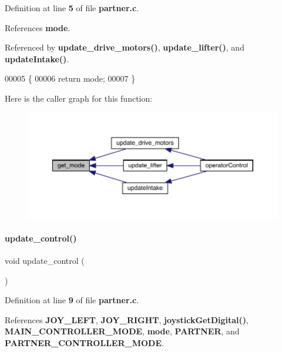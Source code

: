 Definition at line \textbf{ 5} of file \textbf{ partner.\+c}.



References \textbf{ mode}.



Referenced by \textbf{ update\+\_\+drive\+\_\+motors()}, \textbf{ update\+\_\+lifter()}, and \textbf{ update\+Intake()}.


\begin{DoxyCode}
00005                               \{
00006   \textcolor{keywordflow}{return} mode;
00007 \}
\end{DoxyCode}
Here is the caller graph for this function\+:\nopagebreak
\begin{figure}[H]
\begin{center}
\leavevmode
\includegraphics[width=350pt]{partner_8h_aacc86d07e59d3b919f5c5eae2ce5d404_icgraph}
\end{center}
\end{figure}
\mbox{\label{partner_8h_ab2c78903a76d2ed8969271803c78368a}} 
\paragraph{update\+\_\+control()}
{\footnotesize\ttfamily void update\+\_\+control (\begin{DoxyParamCaption}{ }\end{DoxyParamCaption})}



Definition at line \textbf{ 9} of file \textbf{ partner.\+c}.



References \textbf{ J\+O\+Y\+\_\+\+L\+E\+FT}, \textbf{ J\+O\+Y\+\_\+\+R\+I\+G\+HT}, \textbf{ joystick\+Get\+Digital()}, \textbf{ M\+A\+I\+N\+\_\+\+C\+O\+N\+T\+R\+O\+L\+L\+E\+R\+\_\+\+M\+O\+DE}, \textbf{ mode}, \textbf{ P\+A\+R\+T\+N\+ER}, and \textbf{ P\+A\+R\+T\+N\+E\+R\+\_\+\+C\+O\+N\+T\+R\+O\+L\+L\+E\+R\+\_\+\+M\+O\+DE}.



